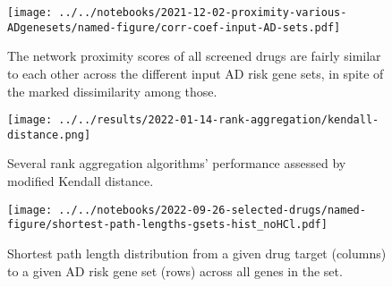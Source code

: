 \documentclass[letterpaper]{article}
\begin{document}
\begin{figure}[p]
\texttt{[image: ../../notebooks/2021-12-02-proximity-various-ADgenesets/named-figure/corr-coef-input-AD-sets.pdf]}
\caption{
The network proximity scores of all
  screened drugs are fairly similar to each other across the different input
  AD risk gene sets, in spite of the marked dissimilarity among those.
}
\label{fig:gset-corr}
\end{figure}





\begin{figure}[p]
\texttt{[image: ../../results/2022-01-14-rank-aggregation/kendall-distance.png]}
\caption{
Several rank aggregation algorithms' performance assessed by modified Kendall
distance.
}
\label{fig:kendall-dist}
\end{figure}


\begin{figure}[p]
\texttt{[image: ../../notebooks/2022-09-26-selected-drugs/named-figure/shortest-path-lengths-gsets-hist\_noHCl.pdf]}
\caption{
  Shortest path length distribution from a given drug target (columns) to a given AD risk gene
  set (rows) across all genes in the set.
}
\label{fig:shortest-path-lengths}
\end{figure}
\end{document}
